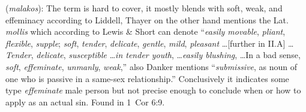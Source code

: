 \item[Catamite (inconclusive),]

(\textit{malakos}):
The term is hard to cover, it mostly blends with soft, weak, and effeminacy according to Liddell, Thayer on the other hand mentions the Lat. \emph{mollis} which according to Lewis \& Short can denote ``\emph{easily movable}, \emph{pliant}, \emph{flexible}, \emph{supple}; \emph{soft}, \emph{tender}, \emph{delicate}, \emph{gentle}, \emph{mild}, \emph{pleasant} \ldots [further in II.A] \ldots \emph{Tender}, \emph{delicate}, \emph{susceptible} \ldots \emph{in tender youth}, \ldots \emph{easily blushing}, \ldots In a bad sense, \emph{soft}, \emph{effeminate}, \emph{unmanly}, \emph{weak},'' also Danker mentions ``\emph{submissive}, as noun of one who is passive in a same-sex relationship.'' Conclusively it indicates some type \emph{effeminate} male person but not precise enough to conclude when or how to apply as an actual sin.
Found in 1~Cor 6:9.
